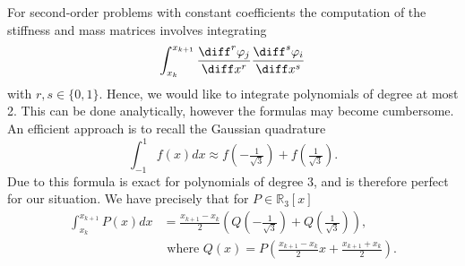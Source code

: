 \begin{remark}
    \label{rem:FEM d=1 Gaussian quadrature}
    For second-order problems with constant coefficients the computation of the stiffness and mass matrices involves integrating
    \begin{equation*}
        \int_{x_k}^{x_{k+1}} \frac{\diff^r \varphi_j}{\diff x^r} \frac{\diff^s \varphi_i}{\diff x^s}
    \end{equation*}
    with $r, s \in \{0,1\}$.
    Hence, we would like to integrate polynomials of degree at most 2. This can be done analytically, however the formulas may become cumbersome. An efficient approach is to recall the Gaussian quadrature
    \begin{equation*}
        \int_{-1}^1 f(x) dx \approx f(-\tfrac{1}{\sqrt{3}}) + f(\tfrac{1}{\sqrt{3}}).
    \end{equation*}
    Due to  this formula is exact for polynomials of degree $3$, and is therefore perfect for our situation. We have precisely that for $P \in \mathbb R_3[x]$
    \begin{equation*}
        \begin{aligned}
            \int_{x_k}^{x_{k+1}} P(x) dx
             & = \frac{x_{k+1} - x_k}{2} \left( Q(-\tfrac{1}{\sqrt{3}}) + Q(\tfrac{1}{\sqrt{3}}) \right),
            \\
             & \text{ where } Q(x) = P\left(\frac{x_{k+1} - x_k}2 x + \frac{x_{k+1}+x_k}{2}\right).
        \end{aligned}
    \end{equation*}
\end{remark}

